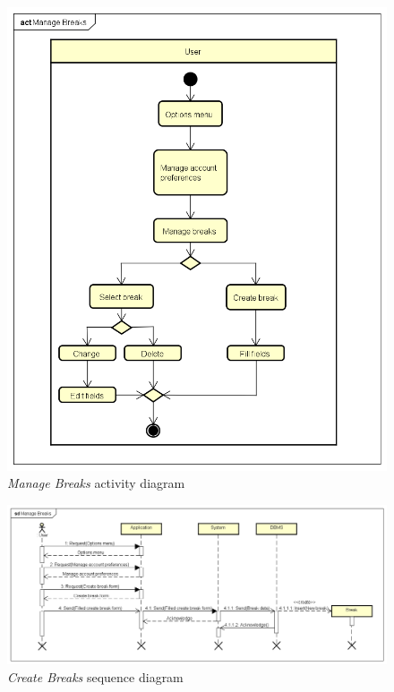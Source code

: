 \begin{figure}[h]
\centering
	\includegraphics[width=\textheight, height=\textwidth, keepaspectratio=true]{Img/ManageBreaksAC}
	\caption{\emph{Manage Breaks} activity diagram}
	\label{fig:ManageBreaksAC}
\end{figure}

\begin{figure}
	\includegraphics[width=\textheight, height=\textwidth, keepaspectratio=true]{Img/CreateBreaksSQ}
	\caption{\emph{Create Breaks} sequence diagram}
	\label{fig:CreateBreaksSQ}
\end{figure}
\clearpage
